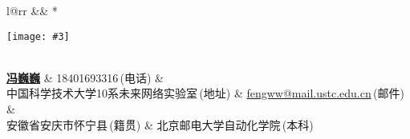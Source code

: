 \newcommand{\paint}[3]{
    \begin{minipage}{#1}
        \texttt{[image: \#3]}
    \end{minipage} 
}
\newcommand{\myheader}{
\begin{tabular*}{\textwidth}{l@{\extracolsep{\fill}}rr}
  && \multirow{4}*{\paint{2.6cm}{3.2cm}{./image.jpg}}\\
  \specialrule{0em}{4pt}{4pt}
  \textbf{\href{http://fengww2014.github.io}{\LARGE 冯巍巍}} & 18401693316$\,${\color{labelgrey}(电话)} &\\
  中国科学技术大学10系未来网络实验室$\,${\color{labelgrey}(地址)} & \href{mailto:fengww@mail.ustc.edu.cn}{fengww@mail.ustc.edu.cn}$\,${\color{labelgrey}(邮件)} & \\
   安徽省安庆市怀宁县$\,${\color{labelgrey}(籍贯)} &  北京邮电大学自动化学院$\,${\color{labelgrey}(本科)} 
  \end{tabular*}\\\vspace{0.1in}
}

\myheader

